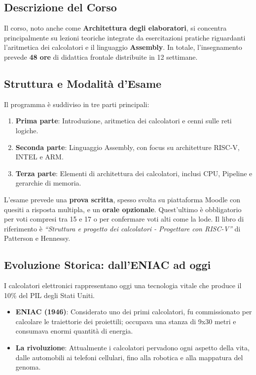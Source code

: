 \documentclass[12pt, a4paper]{article}
\begin{document}
\subsection{Descrizione del Corso}
Il corso, noto anche come \textbf{Architettura degli elaboratori}, si concentra principalmente su lezioni teoriche integrate da esercitazioni pratiche riguardanti l'aritmetica dei calcolatori e il linguaggio \textbf{Assembly}. In totale, l'insegnamento prevede \textbf{48 ore} di didattica frontale distribuite in 12 settimane.

\subsection{Struttura e Modalità d'Esame}
Il programma è suddiviso in tre parti principali:
\begin{enumerate}
    \item \textbf{Prima parte}: Introduzione, aritmetica dei calcolatori e cenni sulle reti logiche.
    \item \textbf{Seconda parte}: Linguaggio Assembly, con focus su architetture RISC-V, INTEL e ARM.
    \item \textbf{Terza parte}: Elementi di architettura dei calcolatori, inclusi CPU, Pipeline e gerarchie di memoria.
\end{enumerate}

L'esame prevede una \textbf{prova scritta}, spesso svolta su piattaforma Moodle con quesiti a risposta multipla, e un \textbf{orale opzionale}. Quest'ultimo è obbligatorio per voti compresi tra 15 e 17 o per confermare voti alti come la lode. Il libro di riferimento è \textit{``Struttura e progetto dei calcolatori - Progettare con RISC-V''} di Patterson e Hennessy.

\subsection{Evoluzione Storica: dall'ENIAC ad oggi}
I calcolatori elettronici rappresentano oggi una tecnologia vitale che produce il 10\% del PIL degli Stati Uniti.
\begin{itemize}
    \item \textbf{ENIAC (1946)}: Considerato uno dei primi calcolatori, fu commissionato per calcolare le traiettorie dei proiettili; occupava una stanza di 9x30 metri e consumava enormi quantità di energia.
    \item \textbf{La rivoluzione}: Attualmente i calcolatori pervadono ogni aspetto della vita, dalle automobili ai telefoni cellulari, fino alla robotica e alla mappatura del genoma.
\end{itemize}
\end{document}
